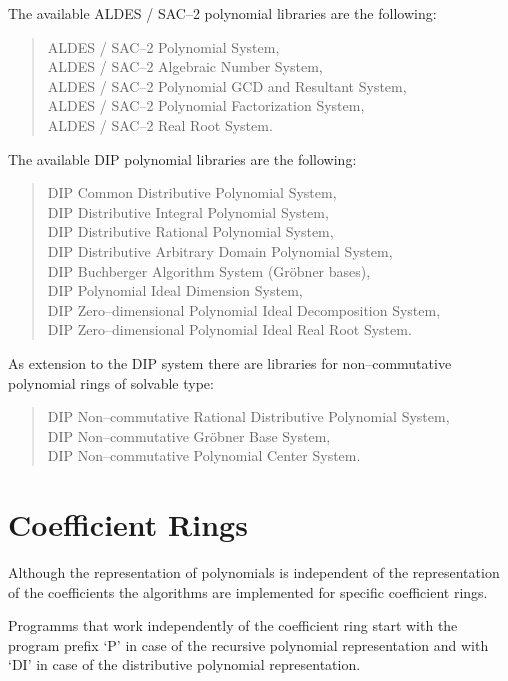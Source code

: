 The available ALDES / SAC--2  polynomial libraries 
are the following:
\begin{quote}
  ALDES / SAC--2 Polynomial System, \\
  ALDES / SAC--2 Algebraic Number System, \\
  ALDES / SAC--2 Polynomial GCD and Resultant System, \\
  ALDES / SAC--2 Polynomial Factorization System, \\
  ALDES / SAC--2 Real Root System. 
\end{quote}

The available DIP polynomial libraries 
are the following:
\begin{quote}
  DIP Common Distributive Polynomial System, \\
  DIP Distributive Integral Polynomial System, \\
  DIP Distributive Rational Polynomial System, \\
  DIP Distributive Arbitrary Domain Polynomial System, \\
  DIP Buchberger Algorithm System (Gr\"obner bases), \\
  DIP Polynomial Ideal Dimension System, \\
  DIP Zero--dimensional Polynomial Ideal Decomposition System, \\
  DIP Zero--dimensional Polynomial Ideal Real Root System. 
\end{quote}

As extension to the DIP system there are libraries 
for non--commutative polynomial rings of solvable type:
\begin{quote}
  DIP Non--commutative Rational Distributive Polynomial System, \\
  DIP Non--commutative Gr\"obner Base System, \\
  DIP Non--commutative Polynomial Center System. 
\end{quote}


\section{Coefficient Rings}

Although the representation of polynomials is independent 
of the representation of the coefficients the 
algorithms are implemented for specific coefficient rings.

Programms that work independently of the coefficient ring 
start with the program prefix `P' in case of the 
recursive polynomial representation 
and with `DI' in case of the 
distributive polynomial representation.


